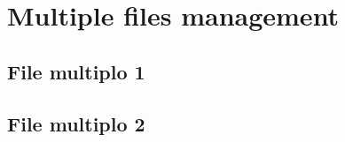 \documentclass[../main.tex]{subfiles}
\begin{document}
\chapter{Multiple files management}
\label{chap:tutorial7}

\section{File multiplo 1}


\section{File multiplo 2}

\end{document}
